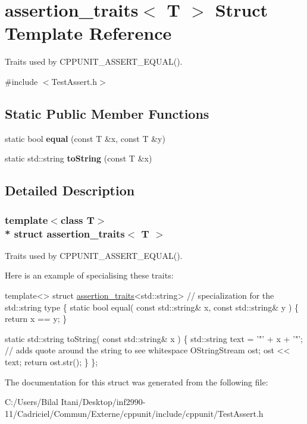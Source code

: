 \hypertarget{structassertion__traits}{}\section{assertion\+\_\+traits$<$ T $>$ Struct Template Reference}
\label{structassertion__traits}


Traits used by C\+P\+P\+U\+N\+I\+T\+\_\+\+A\+S\+S\+E\+R\+T\+\_\+\+E\+Q\+U\+A\+L().  




{\ttfamily \#include $<$Test\+Assert.\+h$>$}

\subsection*{Static Public Member Functions}
\begin{DoxyCompactItemize}
\item 
static bool {\bfseries equal} (const T \&x, const T \&y)\hypertarget{structassertion__traits_a287c07a4e171256a0128201c7e4c4228}{}\label{structassertion__traits_a287c07a4e171256a0128201c7e4c4228}

\item 
static std\+::string {\bfseries to\+String} (const T \&x)\hypertarget{structassertion__traits_a1c96296fb44902b4f22d99b9c3cc7749}{}\label{structassertion__traits_a1c96296fb44902b4f22d99b9c3cc7749}

\end{DoxyCompactItemize}


\subsection{Detailed Description}
\subsubsection*{template$<$class T$>$\\*
struct assertion\+\_\+traits$<$ T $>$}

Traits used by C\+P\+P\+U\+N\+I\+T\+\_\+\+A\+S\+S\+E\+R\+T\+\_\+\+E\+Q\+U\+A\+L(). 

Here is an example of specialising these traits\+:


\begin{DoxyCode}
\textcolor{keyword}{template}<>
\textcolor{keyword}{struct }\hyperlink{structassertion__traits}{assertion\_traits}<std::string>   \textcolor{comment}{// specialization for the std::string type}
\{
  \textcolor{keyword}{static} \textcolor{keywordtype}{bool} equal( \textcolor{keyword}{const} std::string& x, \textcolor{keyword}{const} std::string& y )
  \{
    \textcolor{keywordflow}{return} x == y;
  \}

  \textcolor{keyword}{static} std::string toString( \textcolor{keyword}{const} std::string& x )
  \{
    std::string text = \textcolor{charliteral}{'"'} + x + \textcolor{charliteral}{'"'};    \textcolor{comment}{// adds quote around the string to see whitespace}
    OStringStream ost;
    ost << text;
    \textcolor{keywordflow}{return} ost.str();
  \}
\};
\end{DoxyCode}
 

The documentation for this struct was generated from the following file\+:\begin{DoxyCompactItemize}
\item 
C\+:/\+Users/\+Bilal Itani/\+Desktop/inf2990-\/11/\+Cadriciel/\+Commun/\+Externe/cppunit/include/cppunit/Test\+Assert.\+h\end{DoxyCompactItemize}
